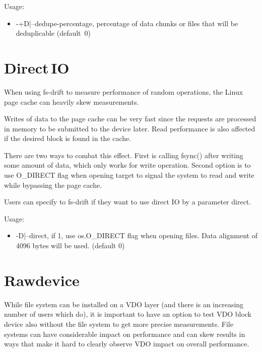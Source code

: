 \documentclass[
  color, %
  table, %
  lof,   %
  lot,   %
]{fithesis3}
\begin{document}
Usage:
\begin{itemize}
    \item -+D|--dedupe-percentage, percentage of data chunks or files that will be deduplicable (default~0)
\end{itemize}


\section{Direct\,IO}
When using fs-drift to measure performance of random operations, the Linux page cache can heavily skew measurements.

Writes of data to the page cache can be very fast since the requests are processed in memory to be submitted to the device later. Read performance is also affected if the desired block is found in the cache.

There are two ways to combat this effect. First is calling fsync() after writing some amount of data, which only works for write operation. Second option is to use O\_DIRECT flag when opening target to signal the system to read and write while bypassing the page cache.



Users can specify to fs-drift if they want to use direct IO by a parameter direct.

Usage:
\begin{itemize}
    \item -D|--direct, if 1, use os.O\_DIRECT flag when opening files. Data alignment of 4096 bytes will be used. (default 0)
\end{itemize}

\section{Rawdevice}
While file system can be installed on a VDO layer (and there is an increasing number of users which do), it is important to have an option to test VDO block device also without the file system to get more precise measurements. File systems can have considerable impact on performance and can skew results in ways that make it hard to clearly observe VDO impact on overall performance.
\end{document}
